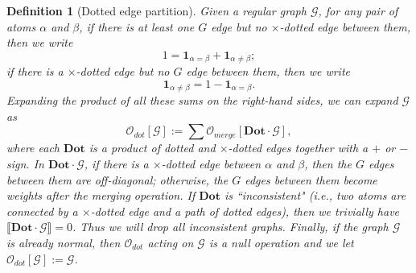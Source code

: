 \documentclass{article}
\newcommand{\1}{\mathds{1}}
\numberwithin{equation}{section}
\newcommand{\al}{\alpha}
\newcommand{\be}{\begin{equation}}
\newcommand{\ee}{\end{equation}}
\renewcommand{\Dot}{\mathbf {Dot}}
\newcommand{\rDot}{\mathbf {rDot}}
\renewcommand{\cal}{\mathcal}
\theoremstyle{plain} %
\newtheorem{definition}[theorem]{Definition}
\theoremstyle{remark}
\newcommand{\cor}{\color{red}}
\newcommand{\hty}[1]{{\cor (ht: #1) }}
\begin{document}
\begin{definition}[Dotted edge partition] \label{dot-def}
	Given a regular graph $\cal G$, for any pair of atoms $\al$ and $\beta$, if there is at least one $G$ edge but no $\times$-dotted edge between them, then we write 
	$$1=\mathbf 1_{\al=\beta} + \mathbf 1_{\al \ne \beta} ;$$
	if there is a $\times$-dotted edge but no $G$ edge between them, then we write 
	$$\mathbf 1_{\al\ne \beta} =1 - \mathbf 1_{\al = \beta}.$$
	Expanding the product of all these sums on the right-hand sides, we can expand $\cal G$ as
	\be\label{odot}\cal O_{dot}[\cal G] := \sum \cal O_{merge}[{\Dot} \cdot \cal G],\ee
	where each ${\Dot}$ is a product of dotted and $\times$-dotted edges together with a $+$ or $-$ sign. %
	In ${\Dot} \cdot \cal G$, if there is a $\times$-dotted edge between $\al$ and $\beta$, then the $G$ edges between them are off-diagonal; otherwise, the $G$ edges between them become weights after the merging operation. If $\Dot$ is ``inconsistent" (i.e., two atoms are connected by a  $\times$-dotted edge and a path of dotted edges), then we trivially have $\llbracket \Dot \cdot \cal G\rrbracket=0$. Thus we will drop all inconsistent graphs.  Finally, if the graph $\cal G$ is already normal, then $\cal O_{dot}$ acting on $\cal G$ is a null operation and we let $\cal O_{dot}[\cal G]:=\cal G$.
	

	
	
	
	
	
	
\end{definition}
\end{document}
